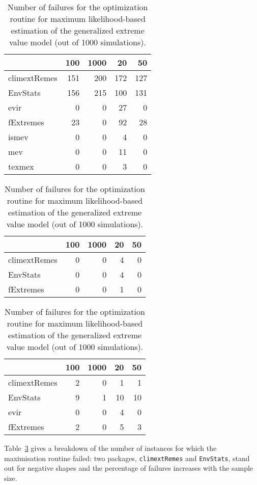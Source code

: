 \documentclass[
  letterpaper,
  DIV=11,
  numbers=noendperiod]{scrartcl}
\begin{document}
\begin{table}

\caption{\label{tbl-gevnonconv}Number of failures for the optimization
routine for maximum likelihood-based estimation of the generalized
extreme value model (out of 1000
simulations).}\begin{minipage}[t]{\linewidth}

{\centering 

\tabularnewline

\centering
\begin{tabular}{lrrrr}
\toprule
  & 100 & 1000 & 20 & 50\\
\midrule
climextRemes & 151 & 200 & 172 & 127\\
EnvStats & 156 & 215 & 100 & 131\\
evir & 0 & 0 & 27 & 0\\
fExtremes & 23 & 0 & 92 & 28\\
ismev & 0 & 0 & 4 & 0\\
mev & 0 & 0 & 11 & 0\\
texmex & 0 & 0 & 3 & 0\\
\bottomrule
\end{tabular}

}

\end{minipage}%
\newline
\begin{minipage}[t]{\linewidth}

{\centering 

\tabularnewline

\centering
\begin{tabular}{lrrrr}
\toprule
  & 100 & 1000 & 20 & 50\\
\midrule
climextRemes & 0 & 0 & 4 & 0\\
EnvStats & 0 & 0 & 4 & 0\\
fExtremes & 0 & 0 & 1 & 0\\
\bottomrule
\end{tabular}

}

\end{minipage}%
\newline
\begin{minipage}[t]{\linewidth}

{\centering 

\tabularnewline

\centering
\begin{tabular}{lrrrr}
\toprule
  & 100 & 1000 & 20 & 50\\
\midrule
climextRemes & 2 & 0 & 1 & 1\\
EnvStats & 9 & 1 & 10 & 10\\
evir & 0 & 0 & 4 & 0\\
fExtremes & 2 & 0 & 5 & 3\\
\bottomrule
\end{tabular}

}

\end{minipage}%

\end{table}

Table~\ref{tbl-gevnonconv} gives a breakdown of the number of instances
for which the maximisation routine failed: two packages,
\texttt{climextRemes} and \texttt{EnvStats}, stand out for negative
shapes and the percentage of failures increases with the sample size.
\end{document}
